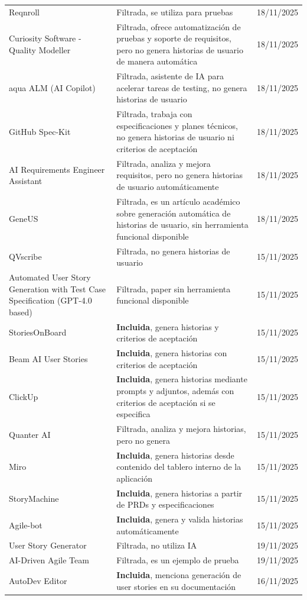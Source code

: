 \begin{center}
\begin{longtable}{|p{6.5cm}|p{4cm}|p{1.8cm}|}
Reqnroll & Filtrada, se utiliza para pruebas & 18/11/2025  \\
Curiosity Software - Quality Modeller & Filtrada, ofrece automatización de pruebas y soporte de requisitos, pero no genera historias de usuario de manera automática & 18/11/2025 \\
aqua ALM (AI Copilot) & Filtrada, asistente de IA para acelerar tareas de testing, no genera historias de usuario & 18/11/2025 \\
GitHub Spec-Kit & Filtrada, trabaja con especificaciones y planes técnicos, no genera historias de usuario ni criterios de aceptación & 18/11/2025 \\
AI Requirements Engineer Assistant & Filtrada, analiza y mejora requisitos, pero no genera historias de usuario automáticamente & 18/11/2025 \\
GeneUS & Filtrada, es un artículo académico sobre generación automática de historias de usuario, sin herramienta funcional disponible & 18/11/2025 \\
QVscribe & Filtrada, no genera historias de usuario & 15/11/2025 \\
Automated User Story Generation with Test Case Specification (GPT-4.0 based) & Filtrada, paper sin herramienta funcional disponible & 15/11/2025 \\
StoriesOnBoard & \textbf{Incluida}, genera historias y criterios de aceptación & 15/11/2025 \\
Beam AI User Stories & \textbf{Incluida}, genera historias con criterios de aceptación & 15/11/2025 \\
ClickUp & \textbf{Incluida}, genera historias mediante prompts y adjuntos, además con criterios de aceptación si se especifica & 15/11/2025 \\
Quanter AI & Filtrada, analiza y mejora historias, pero no genera & 15/11/2025 \\
Miro & \textbf{Incluida}, genera historias desde contenido del tablero interno de la aplicación & 15/11/2025 \\
StoryMachine & \textbf{Incluida}, genera historias a partir de PRDs y especificaciones & 15/11/2025 \\
Agile-bot & \textbf{Incluida}, genera y valida historias automáticamente & 15/11/2025 \\
User Story Generator & Filtrada, no utiliza IA & 19/11/2025 \\
AI-Driven Agile Team & Filtrada, es un ejemplo de prueba & 19/11/2025 \\
AutoDev Editor & \textbf{Incluida}, menciona generación de user stories en su documentación & 16/11/2025 \\

\end{longtable}
\end{center}
